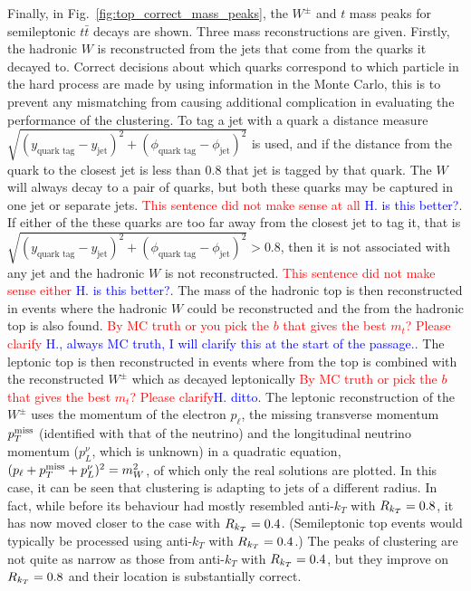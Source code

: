 Finally, in Fig.~\ref{fig:top_correct_mass_peaks}, the $W^\pm$ and $t$ mass peaks for semileptonic $t\bar t$ decays are shown.
Three mass reconstructions are given.
Firstly, the hadronic \(W\) is reconstructed from the jets that come from the quarks it decayed to.
Correct decisions about which quarks correspond to which particle in the hard process are made by using information in the Monte Carlo,
this is to prevent any mismatching from causing additional complication in evaluating the performance of the clustering.
To tag a jet with a quark a distance measure \(\sqrt{(y_\text{quark tag} - y_\text{jet})^2 + (\phi_\text{quark tag} - \phi_\text{jet})^2}\)
is used, and if the distance from the quark to the closest jet is less than \(0.8\) that jet is tagged by that quark.
The \(W\) will always decay to a pair of quarks, but both these quarks may be captured in one jet or separate jets.
{\textcolor{red}{This sentence did not make sense at all} \textcolor{blue}{H. is this better?}}.
If either of the these quarks are too far away from the closest jet to tag it,
that is \(\sqrt{(y_\text{quark tag} - y_\text{jet})^2 + (\phi_\text{quark tag} - \phi_\text{jet})^2} > 0.8\),
then it is not associated with any jet and the hadronic \(W\) is not reconstructed.
{\textcolor{red}{This sentence did not make sense either} \textcolor{blue}{H. is this better?}}.
The mass of the hadronic top is then reconstructed in events where the hadronic \(W\) could be reconstructed and the 
from the hadronic top is also found. {\textcolor{red}{By MC truth or you pick the $b$ that gives the best $m_t$? Please clarify} \textcolor{blue}{H., always MC truth, I will clarify this at the start of the passage.}}.
The leptonic top is then reconstructed in events where  from the top is combined with the reconstructed $W^\pm$ which as decayed leptonically
{\textcolor{red}{By MC truth or pick the $b$ that gives the best $m_t$? Please clarify}\textcolor{blue}{H. ditto}}.
The leptonic reconstruction of the $W^\pm$ uses the momentum of the electron $p_\ell$, the missing transverse momentum $p_T^{\rm miss}$ (identified with that of the neutrino)
and the longitudinal neutrino momentum ($p_L^\nu$, which is unknown) in a quadratic equation, $(p_\ell+p_T^{\rm miss}+p_L^\nu)^2=m_W^2$, of which only the real solutions are plotted.  In this case, it can be seen that \spectral{} clustering is adapting to jets of a different radius. In fact, 
while before its behaviour had mostly resembled anti-$k_T$ with \(R_{k_T}{} = 0.8\), 
it has now moved closer to the case with \(R_{k_T}{} = 0.4\).
(Semileptonic top events would typically be processed using anti-$k_T$ with \(R_{k_T}{} = 0.4\).)
The peaks of \spectral{} clustering are not quite as narrow as those from anti-$k_T$ with \(R_{k_T}{} = 0.4\),
but they improve on \(R_{k_T}{} = 0.8\) and their  location is substantially correct.

